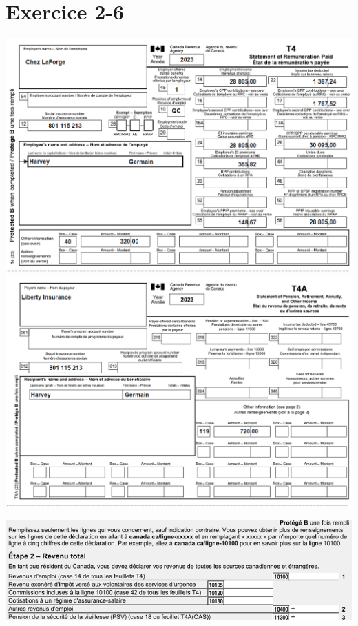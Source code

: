 \section{Exercice 2-6}
\setcounter{question}{0}
\begin{question}
	
\end{question}
\setcounter{sousQuestion}{0}
\begin{sousQuestion}
	
	\begin{center}
		\includegraphics[width=.96\textwidth]{exercice/2-6/Q1/a-T4.png}
		\includegraphics[width=.96\textwidth]{exercice/2-6/Q1/a-T4A.png}
	\end{center}
	
	\noindent
	\includegraphics[width=\textwidth]{exercice/2-6/Q1/a-T1.png}
\end{sousQuestion}
